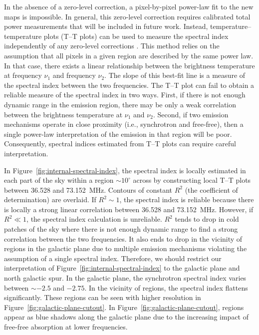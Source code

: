 \documentclass[twocolumn]{aastex61}
\begin{document}
In the absence of a zero-level correction, a pixel-by-pixel power-law fit to the new maps is
impossible. In general, this zero-level correction requires calibrated total power measurements that
will be included in future work.  Instead, temperature--temperature plots (T--T plots) can be used
to measure the spectral index independently of any zero-level corrections
\citep{1962MNRAS.124..297T}.  This method relies on the assumption that all pixels in a given region
are described by the same power law. In that case, there exists a linear relationship between the
brightness temperature at frequency $\nu_1$ and frequency $\nu_2$. The slope of this best-fit line
is a measure of the spectral index between the two frequencies. The T--T plot can fail to obtain a
reliable measure of the spectral index in two ways.  First, if there is not enough dynamic range in
the emission region, there may be only a weak correlation between the brightness temperature at
$\nu_1$ and $\nu_2$.  Second, if two emission mechanisms operate in close proximity (i.e.,
synchrotron and free-free), then a single power-law interpretation of the emission in that region
will be poor. Consequently, spectral indices estimated from T--T plots can require careful
interpretation.

In Figure~\ref{fig:internal-spectral-index}, the spectral index is locally estimated in each part of
the sky within a region $\sim10^\circ$ across by constructing local T--T plots between 36.528 and
73.152~MHz. Contours of constant $R^2$ (the coefficient of determination) are overlaid. If $R^2\sim
1$, the spectral index is reliable because there is locally a strong linear correlation between
36.528 and 73.152~MHz. However, if $R^2\ll 1$, the spectral index calculation is unreliable.  $R^2$
tends to drop in cold patches of the sky where there is not enough dynamic range to find a strong
correlation between the two frequencies. It also  ends to drop in the vicinity of  regions
in the galactic plane due to multiple emission mechanisms violating the assumption of a single
spectral index. Therefore, we should restrict our interpretation of
Figure~\ref{fig:internal-spectral-index} to the galactic plane and north galactic spur. In the
galactic plane, the synchrotron spectral index varies between $\sim-2.5$ and $-2.75$. In the
vicinity of  regions, the spectral index flattens significantly.  These  regions
can be seen with higher resolution in Figure~\ref{fig:galactic-plane-cutout}. In
Figure~\ref{fig:galactic-plane-cutout},  regions appear as blue shadows along the galactic
plane due to the increasing impact of free-free absorption at lower frequencies.
\end{document}
